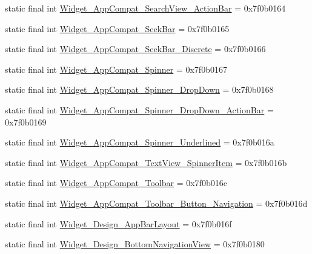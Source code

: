 \begin{CompactItemize}
\item 
static final int \hyperlink{classandroid_1_1support_1_1v7_1_1palette_1_1_r_1_1style_5a256314fbf155fa3158e42c89f80af6}{Widget\_\-AppCompat\_\-SearchView\_\-ActionBar} = 0x7f0b0164
\item 
static final int \hyperlink{classandroid_1_1support_1_1v7_1_1palette_1_1_r_1_1style_3673c35e16554b9ca32eaa1dc72d8256}{Widget\_\-AppCompat\_\-SeekBar} = 0x7f0b0165
\item 
static final int \hyperlink{classandroid_1_1support_1_1v7_1_1palette_1_1_r_1_1style_c89f3546cd057f7b05624b812f796899}{Widget\_\-AppCompat\_\-SeekBar\_\-Discrete} = 0x7f0b0166
\item 
static final int \hyperlink{classandroid_1_1support_1_1v7_1_1palette_1_1_r_1_1style_4d9d59c9df04742d0603ec0c7a36e5c0}{Widget\_\-AppCompat\_\-Spinner} = 0x7f0b0167
\item 
static final int \hyperlink{classandroid_1_1support_1_1v7_1_1palette_1_1_r_1_1style_1857c7e5ea90ef93b13b481efd701c7b}{Widget\_\-AppCompat\_\-Spinner\_\-DropDown} = 0x7f0b0168
\item 
static final int \hyperlink{classandroid_1_1support_1_1v7_1_1palette_1_1_r_1_1style_76018c67cc16e0fe3a52c2560aebd358}{Widget\_\-AppCompat\_\-Spinner\_\-DropDown\_\-ActionBar} = 0x7f0b0169
\item 
static final int \hyperlink{classandroid_1_1support_1_1v7_1_1palette_1_1_r_1_1style_2ecefe5b4d4419548cd403b9d9258829}{Widget\_\-AppCompat\_\-Spinner\_\-Underlined} = 0x7f0b016a
\item 
static final int \hyperlink{classandroid_1_1support_1_1v7_1_1palette_1_1_r_1_1style_78cf7e9e5abf8c6a946af9bf4a569d6f}{Widget\_\-AppCompat\_\-TextView\_\-SpinnerItem} = 0x7f0b016b
\item 
static final int \hyperlink{classandroid_1_1support_1_1v7_1_1palette_1_1_r_1_1style_615966856c0c2ec86c3e92232891b43a}{Widget\_\-AppCompat\_\-Toolbar} = 0x7f0b016c
\item 
static final int \hyperlink{classandroid_1_1support_1_1v7_1_1palette_1_1_r_1_1style_ab7ebe1dd290e9354dd6dc4b0e9abedd}{Widget\_\-AppCompat\_\-Toolbar\_\-Button\_\-Navigation} = 0x7f0b016d
\item 
static final int \hyperlink{classandroid_1_1support_1_1v7_1_1palette_1_1_r_1_1style_0177bd0b99b293bfd4a40d3315bb69ba}{Widget\_\-Design\_\-AppBarLayout} = 0x7f0b016f
\item 
static final int \hyperlink{classandroid_1_1support_1_1v7_1_1palette_1_1_r_1_1style_854c3141c98d1b1908edff2f6f22637d}{Widget\_\-Design\_\-BottomNavigationView} = 0x7f0b0180

\end{CompactItemize}
